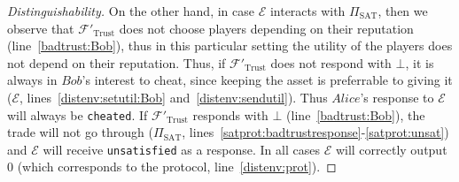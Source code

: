 \begin{proof}[Distinguishability]
    On the other hand, in case $\mathcal{E}$ interacts with $\Pi_{\mathrm{SAT}}$, then we
    observe that $\mathcal{F}'_{\mathrm{Trust}}$ does not choose players depending on
    their reputation (line~\ref{badtrust:Bob}), thus in this particular setting the
    utility of the players does not depend on their reputation. Thus, if
    $\mathcal{F}'_{\mathrm{Trust}}$ does not respond with $\bot$, it is always in $Bob$'s
    interest to cheat, since keeping the asset is preferrable to giving it ($\mathcal{E}$,
    lines~\ref{distenv:setutil:Bob} and~\ref{distenv:sendutil}). Thus $Alice$'s response
    to $\mathcal{E}$ will always be \texttt{cheated}. If $\mathcal{F}'_{\mathrm{Trust}}$
    responds with $\bot$ (line~\ref{badtrust:Bob}), the trade will not go through
    ($\Pi_{\mathrm{SAT}}$, lines~\ref{satprot:badtrustresponse}-\ref{satprot:unsat}) and
    $\mathcal{E}$ will receive \texttt{unsatisfied} as a response. In all cases
    $\mathcal{E}$ will correctly output 0 (which corresponds to the protocol,
    line~\ref{distenv:prot}).
  \end{proof}
